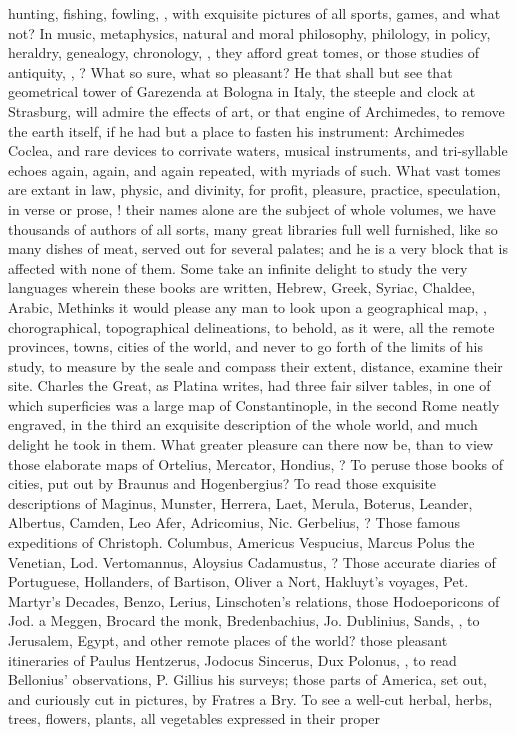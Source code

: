 {hunting, fishing, fowling, \etc{}, with exquisite pictures of all sports, games, and what not? In music, metaphysics, natural and moral philosophy, philology, in policy, heraldry, genealogy, chronology, \etc{}, they afford great tomes, or those studies of antiquity, \etc{}, ? What so sure, what so pleasant? He that shall but see that geometrical tower of Garezenda at Bologna in Italy, the steeple and clock at Strasburg, will admire the effects of art, or that engine of Archimedes, to remove the earth itself, if he had but a place to fasten his instrument: Archimedes Coclea, and rare devices to corrivate waters, musical instruments, and tri-syllable echoes again, again, and again repeated, with myriads of such. What vast tomes are extant in law, physic, and divinity, for profit, pleasure, practice, speculation, in verse or prose, \etc{}! their names alone are the subject of whole volumes, we have thousands of authors of all sorts, many great libraries full well furnished, like so many dishes of meat, served out for several palates; and he is a very block that is affected with none of them. Some take an infinite delight to study the very languages wherein these books are written, Hebrew, Greek, Syriac, Chaldee, Arabic, \etc{} Methinks it would please any man to look upon a geographical map, , chorographical, topographical delineations, to behold, as it were, all the remote provinces, towns, cities of the world, and never to go forth of the limits of his study, to measure by the seale and compass their extent, distance, examine their site. Charles the Great, as Platina writes, had three fair silver tables, in one of which superficies was a large map of Constantinople, in the second Rome neatly engraved, in the third an exquisite description of the whole world, and much delight he took in them. What greater pleasure can there now be, than to view those elaborate maps of Ortelius, Mercator, Hondius, \etc{}? To peruse those books of cities, put out by Braunus and Hogenbergius? To read those exquisite descriptions of Maginus, Munster, Herrera, Laet, Merula, Boterus, Leander, Albertus, Camden, Leo Afer, Adricomius, Nic. Gerbelius, \etc{}? Those famous expeditions of Christoph. Columbus, Americus Vespucius, Marcus Polus the Venetian, Lod. Vertomannus, Aloysius Cadamustus, \etc{}? Those accurate diaries of Portuguese, Hollanders, of Bartison, Oliver a Nort, \etc{} Hakluyt's voyages, Pet. Martyr's Decades, Benzo, Lerius, Linschoten's relations, those Hodoeporicons of Jod. a Meggen, Brocard the monk, Bredenbachius, Jo. Dublinius, Sands, \etc{}, to Jerusalem, Egypt, and other remote places of the world? those pleasant itineraries of Paulus Hentzerus, Jodocus Sincerus, Dux Polonus, \etc{}, to read Bellonius' observations, P. Gillius his surveys; those parts of America, set out, and curiously cut in pictures, by Fratres a Bry. To see a well-cut herbal, herbs, trees, flowers, plants, all vegetables expressed in their proper }
